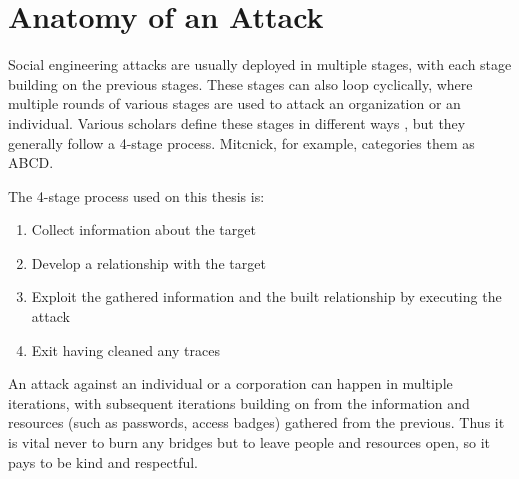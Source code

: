 



\chapter{Anatomy of an Attack\label{chapter:anatomy}}
\begin{comment}

Guides:
    - About 2 pages

TODO:
    [ ] Cover how SE attacks are cyclical

What to cover:
    - The 4-Stage process of SE
        - Gather OSINT
        - Build relationship
        - Exploit relationship / launch the attack
        - Exit / cover traces
    - Cyclical nature of SE attacks
    
Literature:
    - 

\end{comment}

Social engineering attacks are usually deployed in multiple stages, with each stage building on the previous stages. These stages can also loop cyclically, where multiple rounds of various stages are used to attack an organization or an individual. Various scholars define these stages in different ways \citep{mouton_social_2016}, but they generally follow a 4-stage process. Mitcnick, for example, categories them as ABCD.

The 4-stage process used on this thesis is:

\begin{enumerate}
    \item Collect information about the target
    \item Develop a relationship with the target
    \item Exploit the gathered information and the built relationship by executing the attack
    \item Exit having cleaned any traces
\end{enumerate}

An attack against an individual or a corporation can happen in multiple iterations, with subsequent iterations building on from the information and resources (such as passwords, access badges) gathered from the previous. Thus it is vital never to burn any bridges but to leave people and resources open, so it pays to be kind and respectful.

